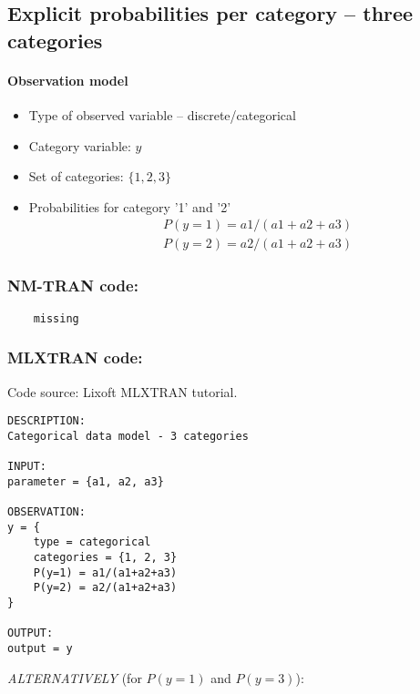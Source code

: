 \subsection{Explicit probabilities per category -- three categories}

\paragraph{Observation model}

\begin{itemize}
\item
Type of observed variable -- discrete/categorical
\item
Category variable: $y$
\item
Set of categories: $\{1,2,3\}$
\item
Probabilities for category '1' and '2'
\begin{eqnarray}
&& P(y=1) = a1/(a1+a2+a3)  \nonumber \\
&& P(y=2) = a2/(a1+a2+a3)  \nonumber 
\end{eqnarray}
\end{itemize}


\subsubsection{NM-TRAN code:}

\myStartLine
\lstset{language=NONMEMdataSet}
\begin{lstlisting}
	missing
\end{lstlisting}
\myEndLine

\subsubsection{MLXTRAN code:}
Code source: Lixoft MLXTRAN tutorial.

\myStartLine
\lstset{language=MLXTRANcode}
\begin{lstlisting}
DESCRIPTION:
Categorical data model - 3 categories

INPUT:
parameter = {a1, a2, a3}

OBSERVATION:
y = {
	type = categorical 
	categories = {1, 2, 3} 
	P(y=1) = a1/(a1+a2+a3) 
	P(y=2) = a2/(a1+a2+a3) 
}

OUTPUT:
output = y
\end{lstlisting}
\myEndLine

\textit{ALTERNATIVELY} (for $P(y=1)$ and $P(y=3)$):

